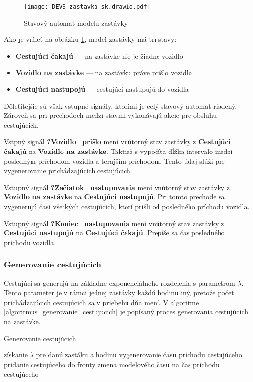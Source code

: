 \begin{figure}[h]
  \label{fig:model_zastavky}
  \centering
  \texttt{[image: DEVS-zastavka-sk.drawio.pdf]}
  \caption{Stavový automat modelu zastávky}
\end{figure}

Ako je vidieť na obrázku \ref{fig:model_zastavky}, model zastávky má tri stavy:
\begin{itemize}
  \item \textbf{Cestujúci čakajú} --- na zastávke nie je žiadne vozidlo
  \item \textbf{Vozidlo na zastávke} --- na zastávku práve prišlo vozidlo
  \item \textbf{Cestujúci nastupojú} --- cestujúci nastupujú do vozidla
\end{itemize}

Dôleťitejšie sú však vstupné signály, ktorími je celý stavový automat riadený.
Zároveň sa pri prechodoch medzi stavmi vykonávajú akcie pre obsluhu cestujúcich.

Vstpný signál \textbf{?Vozidlo\_prišlo} mení vnútorný stav zastávky z \textbf{Cestujúci čakajú} na \textbf{Vozidlo na zastávke}.
Taktiež s vypočíta dĺžka intervalo medzi posledným príchodom vozidla a terajším príchodom.
Tento údaj slúži pre vygenerovanie prichádzajúcich cestujúcich.

Vstupný signál \textbf{?Začiatok\_nastupovania} mení vnútorný stav zastávky z \textbf{Vozidlo na zastávke} na \textbf{Cestujúci nastupujú}.
Pri tomto prechode sa vygenerujú časi všetkých cestujúcich, ktorí prišli od posledného príchodu vozidla.

Vstupný signál \textbf{?Koniec\_nastupovania} mení vnútorný stav zastávky z \textbf{Cestujúci nastupujú} na \textbf{Cestujúci čakajú}.
Prepíše sa čas posledného príchodu vozidla.

\subsubsection{Generovanie cestujúcich}

Cestujúci sa generujú na základne exponenciálneho rozdelenia s parametrom $\lambda$.
Tento parameter je v rámci jednej zastávky každú hodinu iný, pretože počet prichádzajúcich cestujúcich sa v priebehu dňa mení.
V algoritme \ref{algoritmus_generovanie_cestujucich} je popísaný proces generovania cestujúcich na zastávke.

\vspace*{\dimexpr 0.5\baselineskip\relax}
\begin{algorithm}[H]
\label{algoritmus_generovanie_cestujucich}
\caption{Generovanie cestujúcich}
\begin{algorithmic}[1]
  \STATE získanie $\lambda$ pre danú zastáku a hodinu
    \STATE vygenerovanie času príchodu cestujúceho
    \STATE pridanie cestujúceho do fronty
    \STATE zmena modelového času na čas príchodu cestujúceho
  \ENDWHILE
\end{algorithmic}
\end{algorithm}

